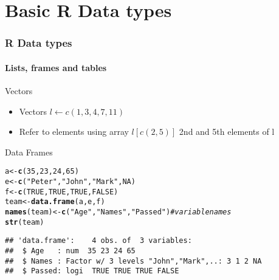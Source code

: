 \documentclass[12pt]{beamer}\usepackage[]{graphicx}\usepackage[]{color}
\makeatletter
\newcommand{\hlnum}[1]{\textcolor[rgb]{0.686,0.059,0.569}{#1}}%
\newcommand{\hlstr}[1]{\textcolor[rgb]{0.192,0.494,0.8}{#1}}%
\newcommand{\hlcom}[1]{\textcolor[rgb]{0.678,0.584,0.686}{\textit{#1}}}%
\newcommand{\hlstd}[1]{\textcolor[rgb]{0.345,0.345,0.345}{#1}}%
\newcommand{\hlkwb}[1]{\textcolor[rgb]{0.69,0.353,0.396}{#1}}%
\newcommand{\hlkwd}[1]{\textcolor[rgb]{0.737,0.353,0.396}{\textbf{#1}}}%
\newenvironment{kframe}{%
 \def\at@end@of@kframe{}%
 \ifinner\ifhmode%
  \def\at@end@of@kframe{\end{minipage}}%
  \begin{minipage}{\columnwidth}%
 \fi\fi%
 \def\FrameCommand##1{\hskip\@totalleftmargin \hskip-\fboxsep
 \colorbox{shadecolor}{##1}\hskip-\fboxsep
     \hskip-\linewidth \hskip-\@totalleftmargin \hskip\columnwidth}%
 \MakeFramed {\advance\hsize-\width
   \@totalleftmargin\z@ \linewidth\hsize
   \@setminipage}}%
 {\par\unskip\endMakeFramed%
 \at@end@of@kframe}
\newenvironment{knitrout}{}{} %
\makeatother
\begin{document}
\section*{Basic R Data types}
\begin{frame}[fragile]
  \frametitle{R Data types}
  \framesubtitle{Lists, frames and tables}
  \begin{block}{Vectors}
      \begin{itemize}
         \item  Vectors $l\leftarrow c(1,3,4,7,11)$
         \item  Refer to elements using array $l[c(2,5)]$ 2nd and 5th elements of l
    \end{itemize}
  \end{block}
  \begin{block}{Data Frames}
 \end{block} 
\begin{knitrout}
\color{fgcolor}\begin{kframe}
\begin{alltt}
\hlstd{a} \hlkwb{<-} \hlkwd{c}\hlstd{(}\hlnum{35}\hlstd{,}\hlnum{23}\hlstd{,}\hlnum{24}\hlstd{,}\hlnum{65}\hlstd{)}
\hlstd{e} \hlkwb{<-} \hlkwd{c}\hlstd{(}\hlstr{"Peter"}\hlstd{,} \hlstr{"John"}\hlstd{,} \hlstr{"Mark"}\hlstd{,} \hlnum{NA}\hlstd{)}
\hlstd{f} \hlkwb{<-} \hlkwd{c}\hlstd{(}\hlnum{TRUE}\hlstd{,}\hlnum{TRUE}\hlstd{,}\hlnum{TRUE}\hlstd{,}\hlnum{FALSE}\hlstd{)}
\hlstd{team} \hlkwb{<-} \hlkwd{data.frame}\hlstd{(a,e,f)}
\hlkwd{names}\hlstd{(team)} \hlkwb{<-} \hlkwd{c}\hlstd{(}\hlstr{"Age"}\hlstd{,}\hlstr{"Names"}\hlstd{,}\hlstr{"Passed"}\hlstd{)} \hlcom{# variable names}
\hlkwd{str}\hlstd{(team)}
\end{alltt}
\begin{verbatim}
## 'data.frame':	4 obs. of  3 variables:
##  $ Age   : num  35 23 24 65
##  $ Names : Factor w/ 3 levels "John","Mark",..: 3 1 2 NA
##  $ Passed: logi  TRUE TRUE TRUE FALSE
\end{verbatim}
\end{kframe}
\end{knitrout}
 
\end{frame}  
\end{document}
